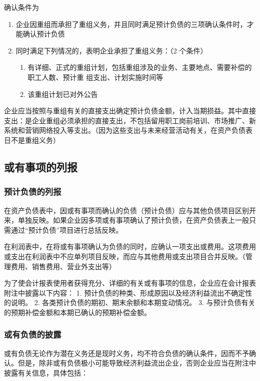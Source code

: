 \documentclass[UTF8,12pt]{ctexart}
\numberwithin{equation}{section} %
\numberwithin{figure}{section}
\numberwithin{table}{section}
\begin{document}
	确认条件为
	\begin{enumerate}
		\item 企业因重组而承担了重组义务，并且同时满足预计负债的三项确认条件时，才能确认预计负债
		
		\item 同时满足下列情况的，表明企业承担了重组义务：（2 个条件）
		\begin{enumerate}
			\item 有详细、正式的重组计划，包括重组涉及的业务、主要地点、需要补偿的职工人数、预计重   组支出、计划实施时间等
			
			\item 该重组计划已对外公告
		\end{enumerate}
		
	\end{enumerate}

	企业应当按照与重组有关的直接支出确定预计负债金额，计入当期损益。其中直接支出：是企业重组必须承担的直接支出，不包括留用职工岗前培训、市场推广、新系统和营销网络投入等支出。（因为这些支出与未来经营活动有关，在资产负债表日不是重组义务）
	
	
	\subsection{或有事项的列报}
	\subsubsection{预计负债的列报}
	在资产负债表中，因或有事项而确认的负债（预计负债）应与其他负债项目区别开来，单独反映。如果企业因多项或有事项确认了预计负债，在资产负债表上一般只需通过“预计负债”项目进行总括反映。
	
	在利润表中，在将或有事项确认为负债的同时，应确认一项支出或费用。这项费用或支出在利润表中不应单列项目反映，而应与其他费用或支出项目合并反映。（管理费用、销售费用、营业外支出等）
	
	为了使会计报表使用者获得充分、详细的有关或有事项的信息，企业应在会计报表  附注中披露以下内容：
	1.	预计负债的种类、形成原因以及经济利益流出不确定性的说明。
	2.	各类预计负债的期初、期末余额和本期变动情况。
	3.	与预计负债有关的预期补偿金额和本期已确认的预期补偿金额。
	
	\subsubsection{或有负债的披露}
	或有负债无论作为潜在义务还是现时义务，均不符合负债的确认条件，因而不予确认。但是，除非或有负债极小可能导致经济利益流出企业，否则企业应当在附注中披露有关信息，具体包括：
	
\end{document}

